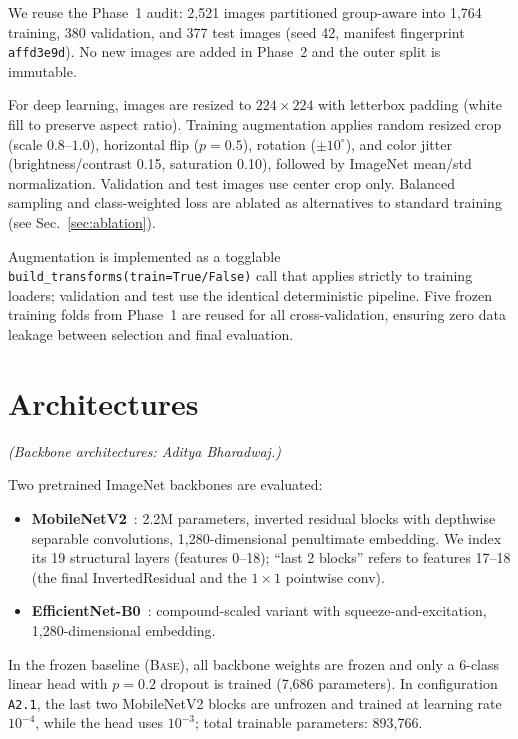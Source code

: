 \documentclass[conference]{IEEEtran}
\begin{document}
We reuse the Phase~1 audit: 2,521 images partitioned group-aware into 1,764 training, 380 validation, and 377 test images (seed 42, manifest fingerprint \texttt{affd3e9d}). No new images are added in Phase~2 and the outer split is immutable.

For deep learning, images are resized to $224\times224$ with letterbox padding (white fill to preserve aspect ratio). Training augmentation applies random resized crop (scale $0.8$--$1.0$), horizontal flip ($p=0.5$), rotation ($\pm10^\circ$), and color jitter (brightness/contrast 0.15, saturation 0.10), followed by ImageNet mean/std normalization. Validation and test images use center crop only. Balanced sampling and class-weighted loss are ablated as alternatives to standard training (see Sec.~\ref{sec:ablation}).

Augmentation is implemented as a togglable \texttt{build\_transforms(train=True/False)} call that applies strictly to training loaders; validation and test use the identical deterministic pipeline. Five frozen training folds from Phase~1 are reused for all cross-validation, ensuring zero data leakage between selection and final evaluation.

\section{Architectures}
\label{sec:arch}
\textit{(Backbone architectures: Aditya Bharadwaj.)}

Two pretrained ImageNet backbones are evaluated:
\begin{itemize}
\item \textbf{MobileNetV2}~\cite{sandler2018mobilenetv2}: 2.2M parameters, inverted residual blocks with depthwise separable convolutions, 1,280-dimensional penultimate embedding. We index its 19 structural layers (features 0--18); ``last 2 blocks'' refers to features 17--18 (the final InvertedResidual and the $1\times1$ pointwise conv).
\item \textbf{EfficientNet-B0}~\cite{tan2019efficientnet}: compound-scaled variant with squeeze-and-excitation, 1,280-dimensional embedding.
\end{itemize}
In the frozen baseline (\textsc{Base}), all backbone weights are frozen and only a 6-class linear head with $p=0.2$ dropout is trained (7,686 parameters). In configuration \texttt{A2.1}, the last two MobileNetV2 blocks are unfrozen and trained at learning rate $10^{-4}$, while the head uses $10^{-3}$; total trainable parameters: 893,766.
\end{document}
